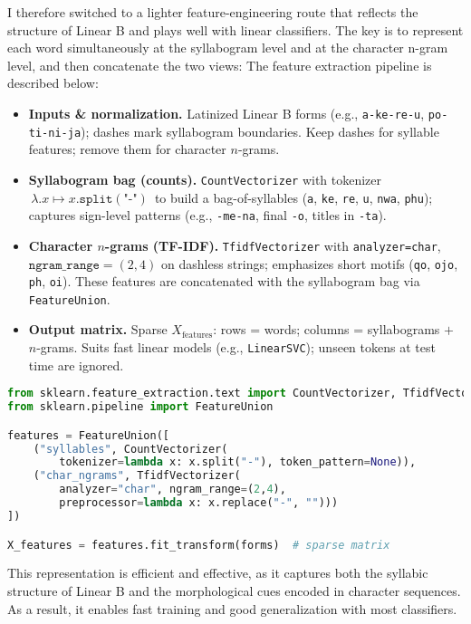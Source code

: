 I therefore switched to a lighter feature-engineering route that reflects the structure of Linear B and plays well with linear classifiers.
The key is to represent each word simultaneously at the syllabogram level and at the character n-gram level, and then concatenate the two views:
The feature extraction pipeline is described below:
\begin{itemize}
  \item \textbf{Inputs \& normalization.} Latinized Linear B forms (e.g., \texttt{a-ke-re-u}, \texttt{po-ti-ni-ja}); dashes mark syllabogram boundaries. Keep dashes for syllable features; remove them for character \(n\)-grams.
  \item \textbf{Syllabogram bag (counts).} \texttt{CountVectorizer} with tokenizer \(\,\lambda.x \mapsto x.\texttt{split}(\texttt{"-"})\,\) to build a bag-of-syllables (\texttt{a}, \texttt{ke}, \texttt{re}, \texttt{u}, \texttt{nwa}, \texttt{phu}); captures sign-level patterns (e.g., \texttt{-me-na}, final \texttt{-o}, titles in \texttt{-ta}).
  \item \textbf{Character \(n\)-grams (TF-IDF).} \texttt{TfidfVectorizer} with \texttt{analyzer=char}, \(\texttt{ngram\_range}=(2,4)\) on dashless strings; emphasizes short motifs (\texttt{qo}, \texttt{ojo}, \texttt{ph}, \texttt{oi}). These features are concatenated with the syllabogram bag via \texttt{FeatureUnion}.
  \item \textbf{Output matrix.} Sparse \(X_{\text{features}}\): rows = words; columns = syllabograms \(+\) \(n\)-grams. Suits fast linear models (e.g., \texttt{LinearSVC}); unseen tokens at test time are ignored.
\end{itemize}

\begin{lstlisting}[language=Python, caption={Syllabogram counts + char \(n\)-gram TF-IDF (concatenated) and transform}, breaklines=true]
from sklearn.feature_extraction.text import CountVectorizer, TfidfVectorizer
from sklearn.pipeline import FeatureUnion

features = FeatureUnion([
    ("syllables", CountVectorizer(
        tokenizer=lambda x: x.split("-"), token_pattern=None)),
    ("char_ngrams", TfidfVectorizer(
        analyzer="char", ngram_range=(2,4),
        preprocessor=lambda x: x.replace("-", "")))
])

X_features = features.fit_transform(forms)  # sparse matrix
\end{lstlisting}

This representation is efficient and effective, as it captures both the syllabic structure of Linear B and the morphological cues encoded in character sequences.
As a result, it enables fast training and good generalization with most classifiers.

